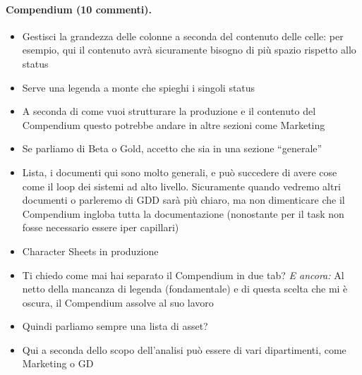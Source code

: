 \paragraph{Compendium (10 commenti).}
{\small
\begin{itemize}
  \item {} Gestisci la grandezza delle colonne a seconda del contenuto delle celle: per esempio, qui il contenuto avrà sicuramente bisogno di più spazio rispetto allo status
  \item {} Serve una legenda a monte che spieghi i singoli status
  \item {} A seconda di come vuoi strutturare la produzione e il contenuto del Compendium questo potrebbe andare in altre sezioni come Marketing
  \item {} Se parliamo di Beta o Gold, accetto che sia in una sezione ``generale''
  \item {} Lista, i documenti qui sono molto generali, e può succedere di avere cose come il loop dei sistemi ad alto livello. Sicuramente quando vedremo altri documenti o parleremo di GDD sarà più chiaro, ma non dimenticare che il Compendium ingloba tutta la documentazione (nonostante per il task non fosse necessario essere iper capillari)
  \item {} Character Sheets in produzione
  \item \rvVuoto Ti chiedo come mai hai separato il Compendium in due tab? \emph{E ancora:} Al netto della mancanza di legenda (fondamentale) e di questa scelta che mi è oscura, il Compendium assolve al suo lavoro
  \item {} Quindi parliamo sempre una lista di asset?
  \item {} Qui a seconda dello scopo dell'analisi può essere di vari dipartimenti, come Marketing o GD
\end{itemize}
}
